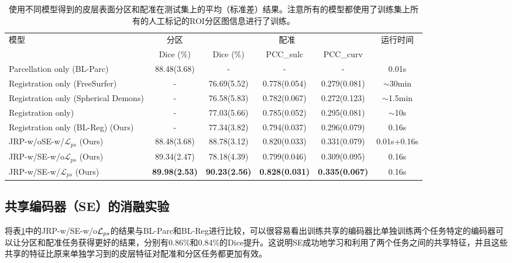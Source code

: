 \begin{table}[t]
	\caption{使用不同模型得到的皮层表面分区和配准在测试集上的平均（标准差）结果。注意所有的模型都使用了训练集上所有的人工标记的ROI分区图信息进行了训练。}\label{tab:同时配准和分区的结果}
	\centering
		\begin{tabular}{l|c|ccc|c}
			\hline
			\multicolumn{1}{l|}{\multirow{2}{*}{模型}} & 分区 & \multicolumn{3}{c|}{配准}              & \multirow{2}{*}{运行时间} \\ \cline{2-5}
			\multicolumn{1}{c|}{}                        & Dice (\%)        & Dice (\%)        & PCC\_sulc        & PCC\_curv       &                           \\ \hline
			Parcellation only (BL-Parc)                & 88.48(3.68)   & -           & -               & -              & 0.01s                     \\ \hline
			Registration only (FreeSurfer\cite{fischl1999high})        & -            & 76.69(5.52) & 0.778(0.054)  & 0.279(0.081) & $\sim$30min               \\ \hline
			Registration only (Spherical Demons\cite{yeo2009spherical})  & -            & 76.58(5.83) & 0.782(0.067)  & 0.272(0.123) & $\sim$1.5min              \\ \hline
			Registration only\cite{zhao2020unsupervised})        & -            & 77.03(5.66) & 0.785(0.052)  & 0.295(0.081) & $\sim$10s                       \\ \hline
			Registration only (BL-Reg) (Ours)                & -            & 77.34(3.82) & 0.794(0.037) & 0.296(0.079) & 0.16s                     \\ \hline
			JRP-w/oSE-w/${\mathcal{L}}_{ps}$ (Ours)      & 88.48(3.68)  & 88.78(3.12) & 0.820(0.033)   & 0.331(0.079) &	0.01s+0.16s                     \\ \hline
			JRP-w/SE-w/o${\mathcal{L}}_{ps}$ (Ours)      &  89.34(2.47) & 78.18(4.39)  & 0.799(0.046)   &	0.309(0.095) &	0.16s                        \\ \hline
			JRP-w/SE-w/${\mathcal{L}}_{ps}$ (Ours)      &   \textbf{89.98(2.53)} &  \textbf{90.23(2.56)}  & \textbf{0.828(0.031)}   &	\textbf{0.335(0.067)} &	0.16s      \\ \hline
		\end{tabular}
\end{table}


\subsection{共享编码器（SE）的消融实验}
将表\ref{tab:同时配准和分区的结果}中的JRP-w/SE-w/o${\cal L}_{ps}$的结果与BL-Parc和BL-Reg进行比较，可以很容易看出训练共享的编码器比单独训练两个任务特定的编码器可以让分区和配准任务获得更好的结果，分别有0.86\%和0.84\%的Dice提升。这说明SE成功地学习和利用了两个任务之间的共享特征，并且这些共享的特征比原来单独学习到的皮层特征对配准和分区任务都更加有效。

